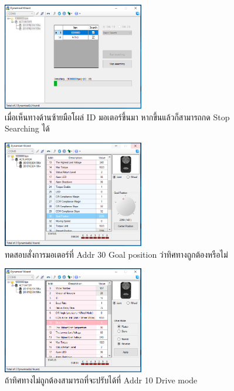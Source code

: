 {\begin{figure}[!ht]
    \includegraphics[width=0.55\textwidth]{chapter3/images/roboplus/roboplus5.PNG}
    \caption*{เมื่อเห็นทางด้านซ้ายมือโผล่ ID มอเตอร์ขึ้นมา หากขึ้นแล้วก็สามารถกด Stop Searching ได้}
\end{figure}
\begin{figure}[!ht]
    \centering
    \includegraphics[width=0.55\textwidth]{chapter3/images/roboplus/roboplus6.PNG}
    \caption*{ทดสอบสั่งการมอเตอร์ที่ Addr 30 Goal position ว่าทิศทางถูกต้องหรือไม่}
\end{figure}
\begin{figure}[!ht]
    \centering
    \includegraphics[width=0.55\textwidth]{chapter3/images/roboplus/roboplus7.PNG}
    \caption*{ถ้าทิศทางไม่ถูกต้องสามารถที่จะปรับได้ที่ Addr 10 Drive mode}
\end{figure}

\clearpage
}
